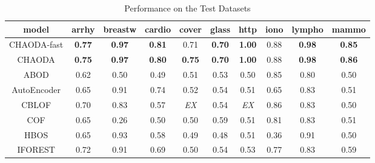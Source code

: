 \begin{table*}[!t]
\renewcommand{\arraystretch}{1.25}
\caption{Performance on the Test Datasets}
\label{table:results:test-performance}
\vskip 0.15in
\begin{center}
\begin{small}
\begin{sc}
\begin{tabular}{|c|c|c|c|c|c|c|c|c|c|}
\hline
\textbf{model} & \textbf{arrhy} & \textbf{breastw} & \textbf{cardio} & \textbf{cover} & \textbf{glass} & \textbf{http} & \textbf{iono} & \textbf{lympho} & \textbf{mammo} \\
\hline
        CHAODA-fast &       \textbf{0.77} &    \textbf{0.97} &   \textbf{0.81} &           0.71 &  \textbf{0.70} & \textbf{1.00} &                0.88 &   \textbf{0.98} &  \textbf{0.85} \\
\hline
        CHAODA &       \textbf{0.75} &    \textbf{0.97} &   \textbf{0.80} &  \textbf{0.75} &  \textbf{0.70} & \textbf{1.00} &                0.88 &   \textbf{0.98} &  \textbf{0.86} \\
\hline
                ABOD &                0.62 &             0.50 &            0.49 &           0.51 &           0.53 &          0.50 &                0.85 &            0.80 &           0.50 \\
\hline
        AutoEncoder &                0.65 &             0.91 &            0.74 &           0.52 &           0.54 &          0.51 &                0.65 &            0.83 &           0.51 \\
\hline
                CBLOF &                0.70 &             0.83 &            0.57 &    \textit{EX} &           0.54 &   \textit{EX} &                0.86 &            0.83 &           0.50 \\
\hline
                COF &                0.65 &             0.26 &            0.50 &           0.50 &           0.59 &          0.51 &                0.81 &            0.83 &           0.51 \\
\hline
                HBOS &                0.65 &             0.93 &            0.58 &           0.49 &           0.48 &          0.51 &                0.36 &            0.91 &           0.50 \\
\hline
        IFOREST &                0.72 &             0.91 &            0.69 &           0.50 &           0.54 &          0.53 &                0.77 &            0.83 &           0.59 \\

\end{tabular}
\end{sc}
\end{small}
\end{center}
\end{table*}
